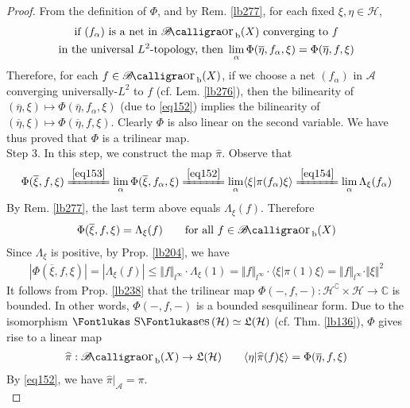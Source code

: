\documentclass[12pt,b5paper,notitlepage]{article}
\theoremstyle{definition}
\theoremstyle{plain}
\DeclareMathOperator{\Borb}{{\mathscr{B}\text{\kern -2pt {\calligra\large or}}\,}_{\mathrm b}}
\DeclareMathOperator{\Ses}{\text{\Fontlukas S}\text{\kern -0pt {\Fontlukas\large es}}\,}
\newcommand{\fk}{\mathfrak}
\newcommand{\wht}{\widehat}
\newcommand{\ovl}{\overline}
\newcommand{\bk}[1]{\langle {#1}\rangle}
\newcommand{\scr}{\mathscr}
\newcommand{\Co}{\complement}
\newcommand{\Cbb}{\mathbb C}
\newcommand{\MH}{\mathcal H}
\numberwithin{equation}{section}
\begin{document}
\begin{proof}
From the definition of $\Phi$, and by Rem. \ref{lb277}, for each fixed $\xi,\eta\in\MH$,
\begin{gather}\label{eq153}
\begin{gathered}
\text{if $(f_\alpha)$ is a net in $\Borb(X)$ converging to $f$}\\
\text{in the universal $L^2$-topology, then }\lim_\alpha\Phi(\ovl\eta,f_\alpha,\xi)=\Phi(\ovl\eta,f,\xi)
\end{gathered}
\end{gather}
Therefore, for each $f\in\Borb(X)$, if we choose a net $(f_\alpha)$ in $\scr A$ converging universally-$L^2$ to $f$ (cf. Lem. \ref{lb276}), then the bilinearity of $(\ovl\eta,\xi)\mapsto\Phi(\ovl\eta,f_\alpha,\xi)$ (due to \eqref{eq152}) implies the bilinearity of $(\ovl\eta,\xi)\mapsto\Phi(\ovl\eta,f,\xi)$. Clearly $\Phi$ is also linear on the second variable. We have thus proved that $\Phi$ is a trilinear map.\\[-1ex]


Step 3. In this step, we construct the map $\wht\pi$. Observe that
\begin{align*}
\Phi(\ovl\xi,f,\xi)\xlongequal{\eqref{eq153}}\lim_\alpha\Phi(\ovl\xi,f_\alpha,\xi)\xlongequal{\eqref{eq152}}\lim_\alpha\bk{\xi|\pi(f_\alpha)\xi}\xlongequal{\eqref{eq154}}\lim_\alpha\Lambda_\xi(f_\alpha)
\end{align*}
By Rem. \ref{lb277}, the last term above equals $\Lambda_\xi(f)$. Therefore
\begin{align}\label{eq155}
\Phi(\ovl\xi,f,\xi)=\Lambda_\xi(f)\qquad\text{for all }f\in\Borb(X)
\end{align}
Since $\Lambda_\xi$ is positive, by Prop. \ref{lb204}, we have
\begin{align*}
|\Phi(\ovl\xi,f,\xi)|=|\Lambda_\xi(f)|\leq\Vert f\Vert_{l^\infty}\cdot\Lambda_\xi(1)=\Vert f\Vert_{l^\infty}\cdot\bk{\xi|\pi(1)\xi}=\Vert f\Vert_{l^\infty}\cdot\Vert\xi\Vert^2
\end{align*}
It follows from Prop. \ref{lb238} that the trilinear map $\Phi(-,f,-):\MH^\Co\times\MH\rightarrow\Cbb$ is bounded. In other words, $\Phi(-,f,-)$ is a bounded sesquilinear form. Due to the isomorphism $\Ses(\MH)\simeq\fk L(\MH)$ (cf. Thm. \ref{lb136}), $\Phi$ gives rise to a linear map
\begin{align}\label{eq156}
\wht\pi:\Borb(X)\rightarrow\fk L(\MH)\qquad \bk{\eta|\wht\pi(f)\xi}=\Phi(\ovl\eta,f,\xi)
\end{align}
By \eqref{eq152}, we have $\wht\pi|_{\scr A}=\pi$.\\[-1ex]


\end{proof}
\end{document}

